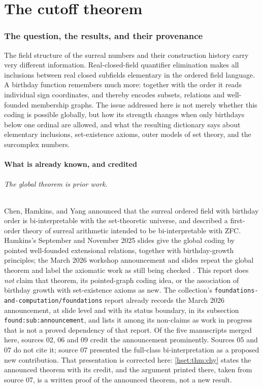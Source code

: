 \documentclass[11pt,letterpaper]{article}
\theoremstyle{definition}
\theoremstyle{remark}
\newcommand{\lbl}[1]{\nolinkurl{#1}}
\newcommand{\repo}[1]{\nolinkurl{#1}}
\begin{document}
\part{The cutoff theorem}\label{hset:part:spine}

\section{The question, the results, and their provenance}
\label{hset:sec:intro}

The field structure of the surreal numbers and their construction history
carry very different information. Real-closed-field quantifier elimination
makes all inclusions between real closed subfields elementary in the ordered
field language. A birthday function remembers much more: together with the
order it reads individual sign coordinates, and thereby encodes subsets,
relations and well-founded membership graphs. The issue addressed here is not
merely whether this coding is possible globally, but how its strength changes
when only birthdays below one ordinal are allowed, and what the resulting
dictionary says about elementary inclusions, set-existence axioms, outer
models of set theory, and the surcomplex numbers.

\subsection{What is already known, and credited}
\label{hset:sub:prior}

\paragraph{The global theorem is prior work.}
Chen, Hamkins, and Yang announced that the surreal ordered field with birthday
order is bi-interpretable with the set-theoretic universe, and described a
first-order theory of surreal arithmetic intended to be bi-interpretable with
ZFC. Hamkins's September and November 2025 slides give the global coding by
pointed well-founded extensional relations, together with birthday-growth
principles; the March 2026 workshop announcement and slides repeat the global
theorem and label the axiomatic work as still being checked
\cite{CHYKobe,CHYNotreDame,CHYCUNY}. This report does \emph{not} claim that
theorem, its pointed-graph coding idea, or the association of birthday growth
with set-existence axioms as new. The collection's
\repo{foundations-and-computation/foundations} report already records the
March 2026 announcement, at slide level and with its status boundary, in its
subsection \lbl{found:sub:announcement}, and lists it among its non-claims as
work in progress that is not a proved dependency of that report. Of the five
manuscripts merged here, sources 02, 06 and 09 credit the announcement
prominently. Sources 05 and 07 do not cite it; source 07 presented the
full-class bi-interpretation as a proposed new contribution. That presentation
is corrected here: \cref{hset:thm:chy} states the announced theorem with its
credit, and the argument printed there, taken from source 07, is a written
proof of the announced theorem, not a new result.
\end{document}
